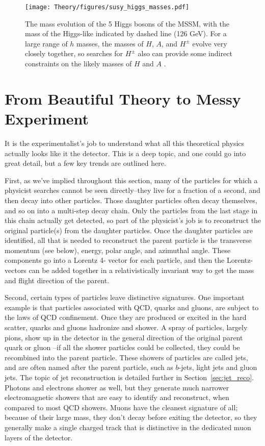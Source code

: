 \begin{figure}
	\centering
	\texttt{[image: Theory/figures/susy\_higgs\_masses.pdf]}
	\caption{The mass evolution of the 5 Higgs bosons of the MSSM, with the 
    mass of the Higgs-like indicated by dashed line (126 GeV).  For a large
    range of $h$ masses, the masses of $H$, $A$, and $H^\pm$ evolve very closely
    together, so searches for $H^\pm$ also can provide some indirect constraints
    on the likely masses of $H$ and $A$ \cite{ellis}. 
    \label{fig:susy_higgs_masses}}
\end{figure}
 


\section{From Beautiful Theory to Messy Experiment}

It is the experimentalist's job to understand what all this theoretical physics actually 
looks like it the detector.  This is a deep topic, and one could 
go into great detail, but a few key trends are outlined here.

First, as we've implied throughout this section, many of the particles 
for which a physicist searches cannot be seen directly--they live for a fraction 
of a second, and then decay into other particles.  Those daughter particles often 
decay themselves, and so on into a  multi-step decay chain.  Only 
the particles from the last stage in this chain actually get detected, so part 
of the physicist's job is to reconstruct the original particle(s) 
from the daughter particles.  Once the daughter particles are identified, all that is 
needed to reconstruct the parent particle is the transverse momentum (see below), energy, 
polar angle, and azimuthal angle.  These components go into a Lorentz 4-
vector for each particle, and then the Lorentz-vectors can be added together 
in a relativistically invariant way to get the mass and flight direction of the parent.

Second, certain types of particles leave distinctive signatures.  One important example is that 
particles associated with QCD, quarks and gluons, are subject to the laws of 
QCD confinement.  Once they are produced or excited in the hard scatter, quarks 
and gluons hadronize and shower.  A spray of particles, largely pions, show 
up in the detector in the general direction of the original parent quark or gluon
--if all the shower particles could be collected, they could be recombined into 
the parent particle.  These showers of particles are called jets, and are often 
named after the parent particle, such as $b$-jets, light jets 
and gluon jets.  The topic of jet reconstruction is detailed further in Section~\ref{sec:jet_reco}.  
Photons and electrons shower as well, but they generate much narrower electromagnetic showers that 
are easy to identify and reconstruct, when compared to most QCD showers.  Muons 
have the cleanest signature of all; because of their large mass, they don't 
decay before exiting the detector, so they generally make a single charged track that 
is distinctive in the dedicated muon layers of the detector.

